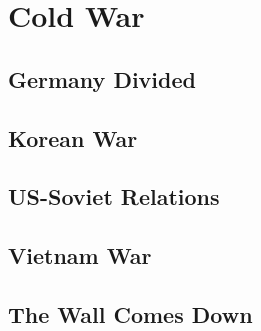 \chapter{Cold War}

\section{Germany Divided}

\section{Korean War}

\section{US-Soviet Relations}

\section{Vietnam War}

\section{The Wall Comes Down}

